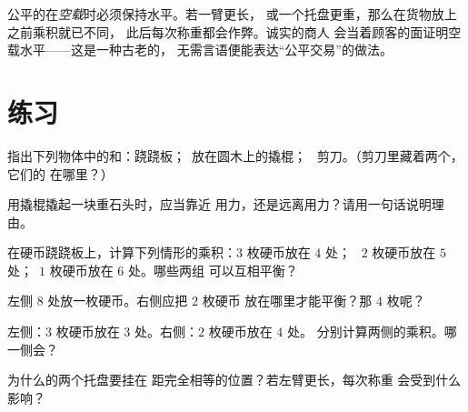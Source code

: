 \begin{remark}[检查空载的天平]\label{rem:g3:levers-and-scales:fair}
公平的在\emph{空载}时必须保持水平。若一臂更长，
或一个托盘更重，那么在货物放上之前乘积就已不同，
此后每次称重都会作弊。诚实的商人
会当着顾客的面证明空载水平——这是一种古老的，
无需言语便能表达“公平交易”的做法。
\end{remark}

\section{练习}

\begin{exercise}[$\star$]\label{exo:g3:levers-and-scales:1}
指出下列物体中的和：跷跷板；\ 放在圆木上的撬棍；
\ 剪刀。（剪刀里藏着两个，它们的
在哪里？）
\end{exercise}

\begin{exercise}[$\star$]\label{exo:g3:levers-and-scales:2}
用撬棍撬起一块重石头时，应当靠近
用力，还是远离用力？请用一句话说明理由。
\end{exercise}

\begin{exercise}[$\star$]\label{exo:g3:levers-and-scales:3}
在硬币跷跷板上，计算下列情形的乘积：$3$ 枚硬币放在 $4$ 处；
\ $2$ 枚硬币放在 $5$ 处；\ $1$ 枚硬币放在 $6$ 处。哪些两组
可以互相平衡？
\end{exercise}

\begin{exercise}[$\star$]\label{exo:g3:levers-and-scales:4}
左侧 $8$ 处放一枚硬币。右侧应把 $2$ 枚硬币
放在哪里才能平衡？那 $4$ 枚呢？
\end{exercise}

\begin{exercise}[$\star$]\label{exo:g3:levers-and-scales:5}
左侧：$3$ 枚硬币放在 $3$ 处。右侧：$2$ 枚硬币放在 $4$ 处。
分别计算两侧的乘积。哪一侧会？
\end{exercise}

\begin{exercise}[$\star$]\label{exo:g3:levers-and-scales:6}
为什么的两个托盘要挂在
距完全相等的位置？若左臂更长，每次称重
会受到什么影响？
\end{exercise}

